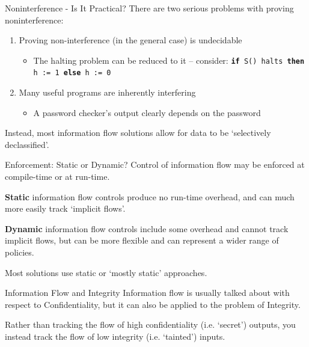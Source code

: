 \begin{frame}{Noninterference - Is It Practical?}
	There are two serious problems with proving noninterference:
	
	\begin{enumerate}
		\item Proving non-interference (in the general case) is undecidable
			\begin{itemize}
				\item The halting problem can be reduced to it -- consider: \newline \texttt{\textbf{if} S() halts \textbf{then} h := 1 \textbf{else} h := 0} \cite{ifbackground:denninghalting}
			\end{itemize}
		\item Many useful programs are inherently interfering
			\begin{itemize}
				\item A password checker's output clearly depends on the password
			\end{itemize}
	\end{enumerate}
	
	Instead, most information flow solutions allow for data to be `selectively declassified'.
\end{frame}

\begin{frame}{Enforcement: Static or Dynamic?}
	Control of information flow may be enforced at compile-time or at run-time.
	
	\textbf{Static} information flow controls produce no run-time overhead, and can much more easily track `implicit flows'.
	
	\textbf{Dynamic} information flow controls include some overhead and cannot track implicit flows, but can be more flexible and can represent a wider range of policies.
	
	Most solutions use static or `mostly static' approaches.
\end{frame}

\begin{frame}{Information Flow and Integrity}
	Information flow is usually talked about with respect to Confidentiality, but it can also be applied to the problem of Integrity.
	
	Rather than tracking the flow of high confidentiality (i.e. `secret') outputs, you instead track the flow of low integrity (i.e. `tainted') inputs.
\end{frame}